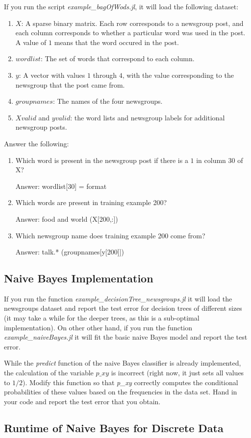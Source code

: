 \documentclass{article}
\def\ans#1{\par\gre{Answer: #1}}
\def\blu#1{{\color{blu}#1}}
\def\gre#1{{\color{gre}#1}}
\def\enum#1{\begin{enumerate}#1\end{enumerate}}
\begin{document}
If you run the script \emph{example\_bagOfWods.jl}, it will load the following dataset:
\enum{
\item $X$: A sparse binary matrix. Each row corresponds to a newsgroup post, and each column corresponds to whether a particular word was used in the post. A value of $1$ means that the word occured in the post.
\item $wordlist$: The set of words that correspond to each column.
\item $y$: A vector with values $1$ through $4$, with the value corresponding to the newsgroup that the post came from.
\item $groupnames$: The names of the four newsgroups.
\item $Xvalid$ and $yvalid$: the word lists and newsgroup labels for additional newsgroup posts.
}
\blu{Answer the following}:
\enum{
\item Which word is present in the newsgroup post if there is a $1$ in column 30 of X?
    \ans{
        wordlist[30] = format
    }
\item Which words are present in training example 200?
    \ans{
        food and world (X[200,:])
    }
\item Which newsgroup name does training example 200 come from?
    \ans{
        talk.* (groupnames[y[200]])
    }
}

\subsection{Naive Bayes Implementation}

If you run the function \emph{example\_decisionTree\_newsgroups.jl} it will load the newsgroups dataset and report the test error for decision trees of different sizes (it may take a while for the deeper trees, as this is a sub-optimal implementation). On other other hand, if you run the function \emph{example\_naiveBayes.jl} it will fit the basic naive Bayes model and report the test error.

While the \emph{predict} function of the naive Bayes classifier is already implemented, the calculation of the variable $p\_xy$ is incorrect (right now, it just sets all values to $1/2$). \blu{Modify this function so that \emph{p\_xy} correctly computes the conditional probabilities of these values based on the frequencies in the data set. Hand in your code and report the test error that you obtain.}


\subsection{Runtime of Naive Bayes for Discrete Data}
\end{document}
